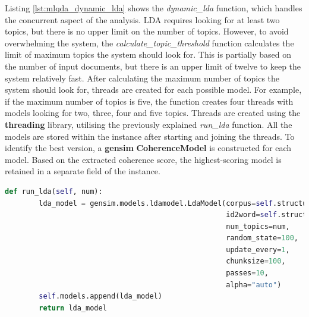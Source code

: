 \documentclass{l4proj}
\begin{document}
Listing \ref{lst:mlqda_dynamic_lda} shows the \textit{dynamic\_lda} function, which handles the concurrent aspect of the analysis. LDA requires looking for at least two topics, but there is no upper limit on the number of topics. However, to avoid overwhelming the system, the \textit{calculate\_topic\_threshold} function calculates the limit of maximum topics the system should look for. This is partially based on the number of input documents, but there is an upper limit of twelve to keep the system relatively fast. After calculating the maximum number of topics the system should look for, threads are created for each possible model. For example, if the maximum number of topics is five, the function creates four threads with models looking for two, three, four and five topics. Threads are created using the \textbf{threading} library, utilising the previously explained \textit{run\_lda} function. All the models are stored within the instance after starting and joining the threads. To identify the best version, a \textbf{gensim} \textbf{CoherenceModel} is constructed for each model. Based on the extracted coherence score, the highest-scoring model is retained in a separate field of the instance.

\begin{lstlisting}[language=python,
caption={Function to run a single LDA Topic Model},
label=lst:mlqda_single_lda]
    def run_lda(self, num):
        lda_model = gensim.models.ldamodel.LdaModel(corpus=self.structures['corpus'],
                                                    id2word=self.structures['id2word'],
                                                    num_topics=num,
                                                    random_state=100,
                                                    update_every=1,
                                                    chunksize=100,
                                                    passes=10,
                                                    alpha="auto")
        self.models.append(lda_model)
        return lda_model
\end{lstlisting}
\end{document}

